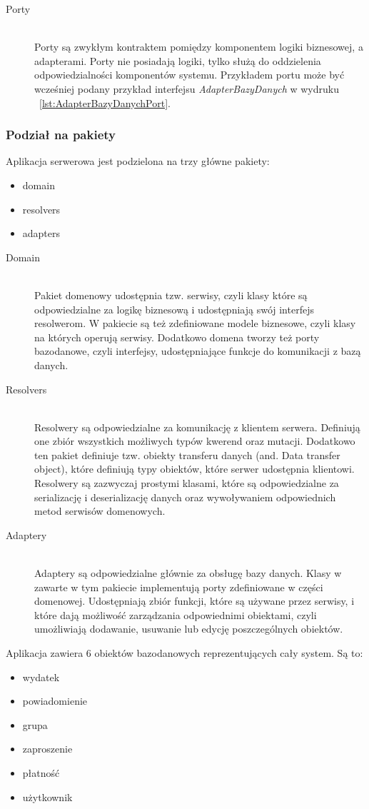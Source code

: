 \begin{description}
\item[Porty] \hfill \\ Porty są zwykłym kontraktem pomiędzy komponentem logiki biznesowej, a adapterami. Porty nie posiadają logiki, tylko służą do oddzielenia odpowiedzialności komponentów systemu. Przykładem portu może być wcześniej podany przykład interfejsu \emph{AdapterBazyDanych} w wydruku ~\ref{lst:AdapterBazyDanychPort}.

\end{description}

\subsubsection{Podział na pakiety}
Aplikacja serwerowa jest podzielona na trzy główne pakiety:
\begin{itemize}
  \item domain
  \item resolvers
  \item adapters
\end{itemize}
\begin{description}

  \item[Domain] \hfill \\ Pakiet domenowy udostępnia tzw. serwisy, czyli klasy które są odpowiedzialne za logikę biznesową i udostępniają swój interfejs resolwerom. W pakiecie są też zdefiniowane modele biznesowe, czyli klasy na których operują serwisy. Dodatkowo domena tworzy też porty bazodanowe, czyli interfejsy, udostępniające funkcje do komunikacji z bazą danych.
  \item[Resolvers] \hfill \\ Resolwery są odpowiedzialne za komunikację z klientem serwera. Definiują one zbiór wszystkich możliwych typów kwerend oraz mutacji. Dodatkowo ten pakiet definiuje tzw. obiekty transferu danych (and. Data transfer object), które definiują typy obiektów, które serwer udostępnia klientowi. Resolwery są zazwyczaj prostymi klasami, które są odpowiedzialne za serializację i deserializację danych oraz wywoływaniem odpowiednich metod serwisów domenowych.
  \item[Adaptery] \hfill \\ Adaptery są odpowiedzialne głównie za obsługę bazy danych. Klasy w zawarte w tym pakiecie implementują porty zdefiniowane w części domenowej. Udostępniają zbiór funkcji, które są używane przez serwisy, i które dają możliwość zarządzania odpowiednimi obiektami, czyli umożliwiają dodawanie, usuwanie lub edycję poszczególnych obiektów.

\end{description}
Aplikacja zawiera 6 obiektów bazodanowych reprezentujących cały system. Są to:
\begin{itemize}
  \item wydatek
  \item powiadomienie
  \item grupa
  \item zaproszenie
  \item płatność
  \item użytkownik
\end{itemize}

